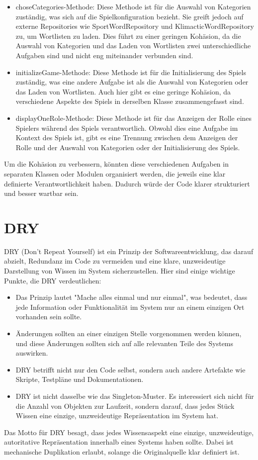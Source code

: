 \begin{itemize}
    \item choseCategories-Methode: Diese Methode ist für die Auswahl von Kategorien zuständig, was sich auf die Spielkonfiguration bezieht. Sie greift jedoch auf externe Repositories wie SportWordRepository und KlimacticWordRepository zu, um Wortlisten zu laden. Dies führt zu einer geringen Kohäsion, da die Auswahl von Kategorien und das Laden von Wortlisten zwei unterschiedliche Aufgaben sind und nicht eng miteinander verbunden sind.
    \item initializeGame-Methode: Diese Methode ist für die Initialisierung des Spiels zuständig, was eine andere Aufgabe ist als die Auswahl von Kategorien oder das Laden von Wortlisten. Auch hier gibt es eine geringe Kohäsion, da verschiedene Aspekte des Spiels in derselben Klasse zusammengefasst sind.
    \item displayOneRole-Methode: Diese Methode ist für das Anzeigen der Rolle eines Spielers während des Spiels verantwortlich. Obwohl dies eine Aufgabe im Kontext des Spiels ist, gibt es eine Trennung zwischen dem Anzeigen der Rolle und der Auswahl von Kategorien oder der Initialisierung des Spiels.
\end{itemize}
    
Um die Kohäsion zu verbessern, könnten diese verschiedenen Aufgaben in separaten Klassen oder Modulen organisiert werden, die jeweils eine klar definierte Verantwortlichkeit haben. Dadurch würde der Code klarer strukturiert und besser wartbar sein.



\section{DRY}
DRY (Don't Repeat Yourself) ist ein Prinzip der Softwareentwicklung, das darauf abzielt, Redundanz im Code zu vermeiden und eine klare, unzweideutige Darstellung von Wissen im System sicherzustellen. Hier sind einige wichtige Punkte, die DRY verdeutlichen:
\begin{itemize}
    \item Das Prinzip lautet "Mache alles einmal und nur einmal", was bedeutet, dass jede Information oder Funktionalität im System nur an einem einzigen Ort vorhanden sein sollte.
    \item Änderungen sollten an einer einzigen Stelle vorgenommen werden können, und diese Änderungen sollten sich auf alle relevanten Teile des Systems auswirken.
    \item DRY betrifft nicht nur den Code selbst, sondern auch andere Artefakte wie Skripte, Testpläne und Dokumentationen.
    \item DRY ist nicht dasselbe wie das Singleton-Muster. Es interessiert sich nicht für die Anzahl von Objekten zur Laufzeit, sondern darauf, dass jedes Stück Wissen eine einzige, unzweideutige Repräsentation im System hat.
\end{itemize}
Das Motto für DRY besagt, dass jedes Wissensaspekt eine einzige, unzweideutige, autoritative Repräsentation innerhalb eines Systems haben sollte. Dabei ist mechanische Duplikation erlaubt, solange die Originalquelle klar definiert ist.

